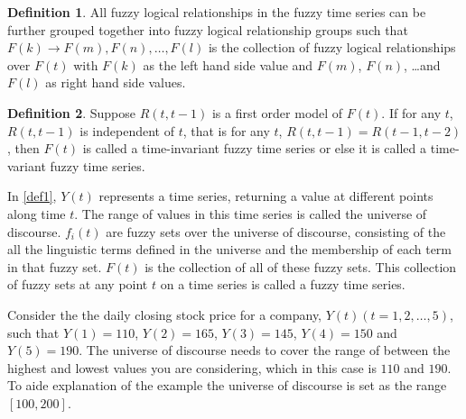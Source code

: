 \documentclass[12pt]{article}
\theoremstyle{definition}
\newtheorem{ftsdef}{Definition}
\begin{document}
\begin{ftsdef}
\label{def3}
All fuzzy logical relationships in the fuzzy time series can be further grouped together into fuzzy logical relationship groups such that $F(k) \rightarrow F(m), F(n), \ldots, F(l)$ is the collection of fuzzy logical relationships over $F(t)$ with $F(k)$ as the left hand side value and $F(m)$, $F(n)$, \ldots and $F(l)$ as right hand side values.
\end{ftsdef}

\begin{ftsdef}
\label{def4}
Suppose $R(t,t-1)$ is a first order model of $F(t)$. If for any $t$, $R(t,t-1)$ is independent of $t$, that is for any $t$, $R(t,t-1) = R(t-1,t-2)$, then $F(t)$ is called a time-invariant fuzzy time series or else it is called a time-variant fuzzy time series.
\end{ftsdef}

In \cref{def1}, $Y(t)$ represents a time series, returning a value at different points along time $t$. The range of values in this time series is called the universe of discourse. $f_i(t)$ are fuzzy sets over the universe of discourse, consisting of the all the linguistic terms defined in the universe and the membership of each term in that fuzzy set. $F(t)$ is the collection of all of these fuzzy sets. This collection of fuzzy sets at any point $t$ on a time series is called a fuzzy time series.

\begin{center}
\end{center}

Consider the the daily closing stock price for a company, $Y(t)(t=1,2,\ldots,5)$, such that $Y(1) = 110$, $Y(2) = 165$, $Y(3) = 145$, $Y(4) = 150$ and $Y(5) = 190$. The universe of discourse needs to cover the range of between the highest and lowest values you are considering, which in this case is $110$ and $190$. To aide explanation of the example the universe of discourse is set as the range $[100,200]$.
\end{document}
